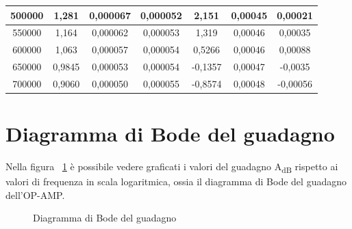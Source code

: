 \begin{table}[!ht]
\begin{tabular}{|c|c|c|c|c|c|c|}
        500000 & 1,281 & 0,000067 & 0,000052 & 2,151 & 0,00045 & 0,00021 \\ \hline
        550000 & 1,164 & 0,000062 & 0,000053 & 1,319 & 0,00046 & 0,00035 \\ \hline
        600000 & 1,063 & 0,000057 & 0,000054 & 0,5266 & 0,00046 & 0,00088 \\ \hline
        650000 & 0,9845 & 0,000053 & 0,000054 & -0,1357 & 0,00047 & -0,0035 \\ \hline
        700000 & 0,9060 & 0,000050 & 0,000055 & -0,8574 & 0,00048 & -0,00056 \\ \hline
    \end{tabular}
\end{table}

\section{Diagramma di Bode del guadagno}
Nella figura ~\ref{fig:Bode} è possibile vedere graficati i valori del guadagno A\textsubscript{dB} rispetto ai valori di frequenza in scala logaritmica, ossia il diagramma di Bode del guadagno dell'OP-AMP. 

\begin{figure}
    \centering
    \caption{Diagramma di Bode del guadagno}
    \label{fig:Bode}
\end{figure}


